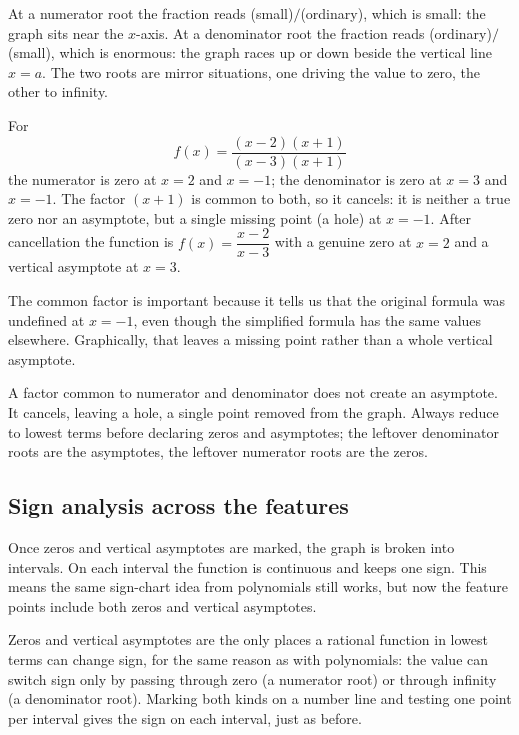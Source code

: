 \documentclass[12pt]{book}
\begin{document}
\begin{visual}
At a numerator root the fraction reads (small)$/$(ordinary), which is small: the
graph sits near the $x$-axis. At a denominator root the fraction reads
(ordinary)$/$(small), which is enormous: the graph races up or down beside the
vertical line $x=a$. The two roots are mirror situations, one driving the value to
zero, the other to infinity.
\end{visual}

\begin{example}
For
\[
f(x)=\frac{(x-2)(x+1)}{(x-3)(x+1)}
\]
the numerator is zero at $x=2$ and $x=-1$; the denominator is zero at $x=3$ and
$x=-1$. The factor $(x+1)$ is common to both, so it cancels: it is neither a true
zero nor an asymptote, but a single missing point (a hole) at $x=-1$. After
cancellation the function is $f(x)=\dfrac{x-2}{x-3}$ with a genuine zero at $x=2$ and
a vertical asymptote at $x=3$.
\end{example}

The common factor is important because it tells us that the original formula was
undefined at $x=-1$, even though the simplified formula has the same values
elsewhere. Graphically, that leaves a missing point rather than a whole vertical
asymptote.

\begin{pitfall}
A factor common to numerator and denominator does not create an asymptote. It
cancels, leaving a hole, a single point removed from the graph. Always reduce to
lowest terms before declaring zeros and asymptotes; the leftover denominator roots
are the asymptotes, the leftover numerator roots are the zeros.
\end{pitfall}

\subsection{Sign analysis across the features}

Once zeros and vertical asymptotes are marked, the graph is broken into intervals.
On each interval the function is continuous and keeps one sign. This means the same
sign-chart idea from polynomials still works, but now the feature points include both
zeros and vertical asymptotes.

Zeros and vertical asymptotes are the only places a rational function in lowest terms
can change sign, for the same reason as with polynomials: the value can switch sign
only by passing through zero (a numerator root) or through infinity (a denominator
root). Marking both kinds on a number line and testing one point per interval gives
the sign on each interval, just as before.
\end{document}
